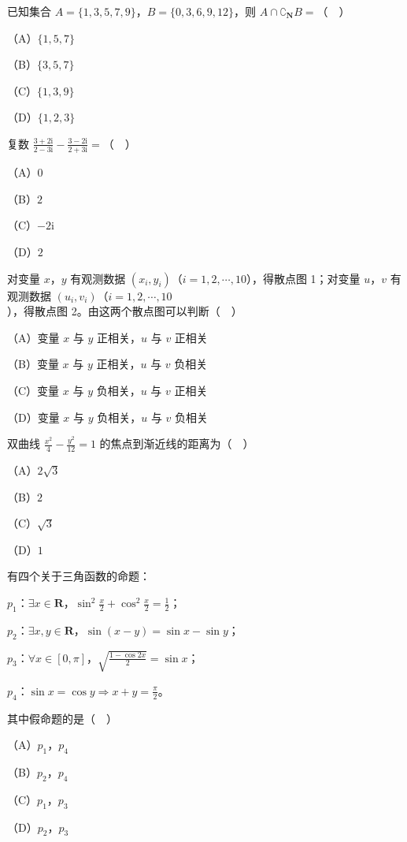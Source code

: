 \begin{question}
已知集合 $A=\{1,3,5,7,9\}$，$B=\{0,3,6,9,12\}$，则 $A\cap\complement_{\mathbf N}B=$（　）

（A）$\{1,5,7\}$

（B）$\{3,5,7\}$

（C）$\{1,3,9\}$

（D）$\{1,2,3\}$

\end{question}
\begin{question}
复数 $\frac{3+2\mathrm i}{2-3\mathrm i}-\frac{3-2\mathrm i}{2+3\mathrm i}=$（　）

（A）$0$

（B）$2$

（C）$-2\mathrm i$

（D）$2$

\Needspace{0.4\textheight}
\end{question}
\begin{question}
对变量 $x$，$y$ 有观测数据 $(x_i,y_i)$（$i=1,2,\cdots,10$），得散点图 1；对变量 $u$，$v$ 有观测数据 $(u_i,v_i)$（$i=1,2,\cdots,10$），得散点图 2。由这两个散点图可以判断（　）
\nopagebreak[4]
\begin{center}\end{center}
\nopagebreak[4]
（A）变量 $x$ 与 $y$ 正相关，$u$ 与 $v$ 正相关

（B）变量 $x$ 与 $y$ 正相关，$u$ 与 $v$ 负相关

（C）变量 $x$ 与 $y$ 负相关，$u$ 与 $v$ 正相关

（D）变量 $x$ 与 $y$ 负相关，$u$ 与 $v$ 负相关

\end{question}
\begin{question}
双曲线 $\frac{x^2}{4}-\frac{y^2}{12}=1$ 的焦点到渐近线的距离为（　）

（A）$2\sqrt3$

（B）$2$

（C）$\sqrt3$

（D）$1$

\end{question}
\begin{question}
有四个关于三角函数的命题：

$p_1$：$\exists x\in\mathbf R$，$\sin^2\frac x2+\cos^2\frac x2=\frac12$；

$p_2$：$\exists x,y\in\mathbf R$，$\sin(x-y)=\sin x-\sin y$；

$p_3$：$\forall x\in[0,\pi]$，$\sqrt{\frac{1-\cos2x}{2}}=\sin x$；

$p_4$：$\sin x=\cos y\Rightarrow x+y=\frac{\pi}{2}$。

其中假命题的是（　）

（A）$p_1$，$p_4$

（B）$p_2$，$p_4$

（C）$p_1$，$p_3$

（D）$p_2$，$p_3$

\end{question}
